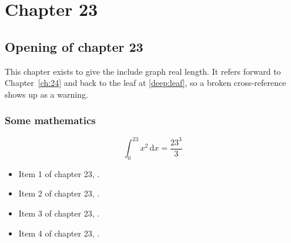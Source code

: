\chapter{Chapter 23}
\label{ch:23}
\section{Opening of chapter 23}
This chapter exists to give the include graph real length. It refers
forward to Chapter~\ref{ch:24} and back to the leaf
at \ref{deep:leaf}, so a broken cross-reference shows up as a warning.

\subsection{Some mathematics}
\begin{equation}
  \int_0^{23} x^{2} \, \mathrm{d}x = \frac{23^{3}}{3}
\end{equation}

\begin{itemize}
  \item Item 1 of chapter 23, .
  \item Item 2 of chapter 23, .
  \item Item 3 of chapter 23, .
  \item Item 4 of chapter 23, .
\end{itemize}
